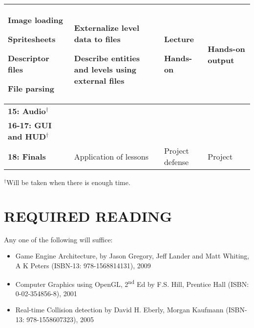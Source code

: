 \documentclass[10pt]{article}
\newenvironment{itemize*}{
\begin{itemize}[leftmargin=1em,noitemsep,nolistsep]
}{\end{itemize}}
\begin{document}
\begin{longtable}{||p{1.8in}|p{2.4in}|p{1.3in}|p{1in}||}
\begin{itemize*}
		\item Image loading
		\item Spritesheets
		\item Descriptor files
		\item File parsing
	\end{itemize*} &
	\begin{itemize*}
		\item Externalize level data to files
		\item Describe entities and levels using external files
	\end{itemize*} &
	\begin{itemize*}
		\item Lecture
		\item Hands-on
	\end{itemize*} & Hands-on output\\ \hline
\textbf{15: Audio$^\dagger$} & & &\\ \hline
\textbf{16-17: GUI and HUD$^\dagger$} & & &\\ \hline
\textbf{18: Finals} & Application of lessons & Project defense & Project \\ \hline
\end{longtable}

$^\dagger$Will be taken when there is enough time.

\section{REQUIRED READING}
Any one of the following will suffice:
\begin{itemize}[noitemsep,nolistsep]
\item Game Engine Architecture, by Jason Gregory, Jeff Lander and Matt Whiting, A K Peters (ISBN-13: 978-1568814131), 2009
\item Computer Graphics using OpenGL, 2\textsuperscript{nd} Ed by F.S. Hill, Prentice Hall (ISBN: 0-02-354856-8), 2001
\item Real-time Collision detection by David H. Eberly, Morgan Kaufmann (ISBN-13: 978-1558607323), 2005
\end{itemize}
\end{document}
